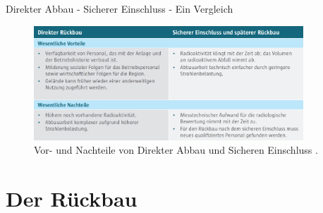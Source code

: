 \begin{frame}{ Direkter Abbau - Sicherer Einschluss - Ein Vergleich}
  \begin{figure}
     \centering
     \includegraphics[width=0.9\textwidth]{./bilder/vor_nachteile_direkter_einschluss.PNG}
     \caption{ Vor- und Nachteile von Direkter Abbau und Sicheren Einschluss \cite{stilllegung_grs}. }
     \label{ fig: karte_abschaltungen }
   \end{figure}
\end{frame}



\section{Der Rückbau}



